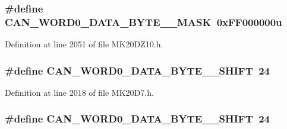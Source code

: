 \subsubsection[{\texorpdfstring{C\+A\+N\+\_\+\+W\+O\+R\+D0\+\_\+\+D\+A\+T\+A\+\_\+\+B\+Y\+T\+E\+\_\+0\+\_\+\+M\+A\+SK}{CAN_WORD0_DATA_BYTE_0_MASK}}]{\setlength{\rightskip}{0pt plus 5cm}\#define C\+A\+N\+\_\+\+W\+O\+R\+D0\+\_\+\+D\+A\+T\+A\+\_\+\+B\+Y\+T\+E\+\_\+\_\+\+M\+A\+SK~0x\+F\+F000000u}\hypertarget{group___c_a_n___register___masks_ga850d4e3257b02cacead5d9e2b757818c}{}\label{group___c_a_n___register___masks_ga850d4e3257b02cacead5d9e2b757818c}


Definition at line 2051 of file M\+K20\+D\+Z10.\+h.

\subsubsection[{\texorpdfstring{C\+A\+N\+\_\+\+W\+O\+R\+D0\+\_\+\+D\+A\+T\+A\+\_\+\+B\+Y\+T\+E\+\_\+0\+\_\+\+S\+H\+I\+FT}{CAN_WORD0_DATA_BYTE_0_SHIFT}}]{\setlength{\rightskip}{0pt plus 5cm}\#define C\+A\+N\+\_\+\+W\+O\+R\+D0\+\_\+\+D\+A\+T\+A\+\_\+\+B\+Y\+T\+E\+\_\+\_\+\+S\+H\+I\+FT~24}\hypertarget{group___c_a_n___register___masks_gaf84582fa0ea01d047081e02025634145}{}\label{group___c_a_n___register___masks_gaf84582fa0ea01d047081e02025634145}


Definition at line 2018 of file M\+K20\+D7.\+h.

\subsubsection[{\texorpdfstring{C\+A\+N\+\_\+\+W\+O\+R\+D0\+\_\+\+D\+A\+T\+A\+\_\+\+B\+Y\+T\+E\+\_\+0\+\_\+\+S\+H\+I\+FT}{CAN_WORD0_DATA_BYTE_0_SHIFT}}]{\setlength{\rightskip}{0pt plus 5cm}\#define C\+A\+N\+\_\+\+W\+O\+R\+D0\+\_\+\+D\+A\+T\+A\+\_\+\+B\+Y\+T\+E\+\_\+\_\+\+S\+H\+I\+FT~24}\hypertarget{group___c_a_n___register___masks_gaf84582fa0ea01d047081e02025634145}{}\label{group___c_a_n___register___masks_gaf84582fa0ea01d047081e02025634145}


